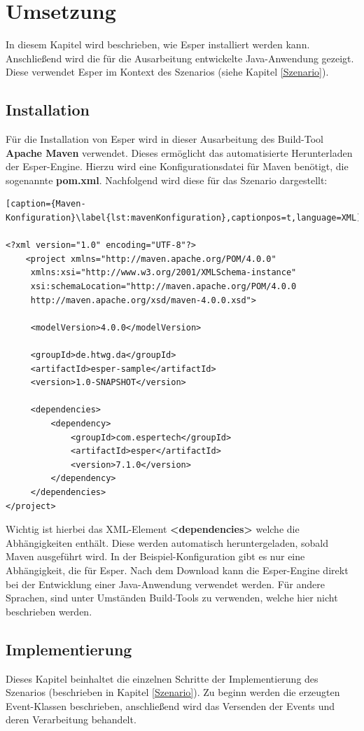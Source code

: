 \chapter{Umsetzung}
In diesem Kapitel wird beschrieben, wie Esper installiert werden kann. Anschließend wird die für die Ausarbeitung entwickelte Java-Anwendung gezeigt. Diese verwendet Esper im Kontext des Szenarios (siehe Kapitel \ref{Szenario}).

\section{Installation}
Für die Installation von Esper wird in dieser Ausarbeitung des Build-Tool \textbf{Apache Maven} verwendet. 
Dieses ermöglicht das automatisierte Herunterladen der Esper-Engine. Hierzu wird eine Konfigurationsdatei für Maven benötigt, die sogenannte \textbf{pom.xml}. Nachfolgend wird diese für das Szenario dargestellt:

\begin{lstlisting}[caption={Maven-Konfiguration}\label{lst:mavenKonfiguration},captionpos=t,language=XML]

<?xml version="1.0" encoding="UTF-8"?>
    <project xmlns="http://maven.apache.org/POM/4.0.0"
     xmlns:xsi="http://www.w3.org/2001/XMLSchema-instance"
     xsi:schemaLocation="http://maven.apache.org/POM/4.0.0
     http://maven.apache.org/xsd/maven-4.0.0.xsd">
		
     <modelVersion>4.0.0</modelVersion>

     <groupId>de.htwg.da</groupId>
     <artifactId>esper-sample</artifactId>
     <version>1.0-SNAPSHOT</version>

     <dependencies>
         <dependency>
             <groupId>com.espertech</groupId>
             <artifactId>esper</artifactId>
             <version>7.1.0</version>
         </dependency>
     </dependencies>
</project>

\end{lstlisting}
Wichtig ist hierbei das XML-Element \textbf{<dependencies>} welche die Abhängigkeiten enthält. Diese werden automatisch heruntergeladen, sobald Maven ausgeführt wird. In der Beispiel-Konfiguration gibt es nur eine Abhängigkeit, die für Esper.
\absatz
Nach dem Download kann die Esper-Engine direkt bei der Entwicklung einer Java-Anwendung verwendet werden. Für andere Sprachen, sind unter Umständen Build-Tools zu verwenden, welche hier nicht beschrieben werden.

\section{Implementierung}
Dieses Kapitel beinhaltet die einzelnen Schritte der Implementierung des Szenarios (beschrieben in Kapitel \ref{Szenario}). Zu beginn werden die erzeugten Event-Klassen beschrieben, anschließend wird das Versenden der Events und deren Verarbeitung behandelt.

